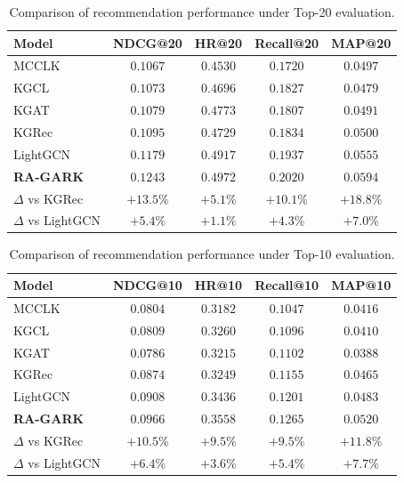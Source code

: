 \begin{table}[H]
\centering
\caption{Comparison of recommendation performance under Top-20 evaluation.}
\label{tab:main}
\begin{tabular}{lcccc}
\toprule
Model & NDCG@20 & HR@20 & Recall@20 & MAP@20 \\
\midrule
MCCLK~\cite{zou2022mcclk}   & $0.1067$ & $0.4530$ & $0.1720$ & $0.0497$ \\
KGCL~\cite{yang2022kgcl}    & $0.1073$ & $0.4696$ & $0.1827$ & $0.0479$ \\
KGAT~\cite{wang2019kgat}    & $0.1079$ & $0.4773$ & $0.1807$ & $0.0491$ \\
KGRec~\cite{yang2023kgrec}  & $0.1095$ & $0.4729$ & $0.1834$ & $0.0500$ \\
LightGCN~\cite{he2020lightgcn} & $0.1179$ & $0.4917$ & $0.1937$ & $0.0555$ \\
\midrule
\textbf{RA-GARK}     & $\mathbf{0.1243}$ & $\mathbf{0.4972}$ & $\mathbf{0.2020}$ & $\mathbf{0.0594}$ \\
\midrule
$\Delta$ vs KGRec            & $+13.5\%$ & $+5.1\%$  & $+10.1\%$ & $+18.8\%$ \\
$\Delta$ vs LightGCN         & $+5.4\%$  & $+1.1\%$  & $+4.3\%$  & $+7.0\%$  \\
\bottomrule
\end{tabular}
\end{table}

\begin{table}[H]
\centering
\caption{Comparison of recommendation performance under Top-10 evaluation.}
\label{tab:main@10}
\begin{tabular}{lcccc}
\toprule
Model & NDCG@10 & HR@10 & Recall@10 & MAP@10 \\
\midrule
MCCLK~\cite{zou2022mcclk}   & $0.0804$ & $0.3182$ & $0.1047$ & $0.0416$ \\
KGCL~\cite{yang2022kgcl}    & $0.0809$ & $0.3260$ & $0.1096$ & $0.0410$ \\
KGAT~\cite{wang2019kgat}    & $0.0786$ & $0.3215$ & $0.1102$ & $0.0388$ \\
KGRec~\cite{yang2023kgrec}  & $0.0874$ & $0.3249$ & $0.1155$ & $0.0465$ \\
LightGCN~\cite{he2020lightgcn} & $0.0908$ & $0.3436$ & $0.1201$ & $0.0483$ \\
\midrule
\textbf{RA-GARK}     & $\mathbf{0.0966}$ & $\mathbf{0.3558}$ & $\mathbf{0.1265}$ & $\mathbf{0.0520}$ \\
\midrule
$\Delta$ vs KGRec            & $+10.5\%$ & $+9.5\%$  & $+9.5\%$  & $+11.8\%$ \\
$\Delta$ vs LightGCN         & $+6.4\%$  & $+3.6\%$  & $+5.4\%$  & $+7.7\%$  \\
\bottomrule
\end{tabular}
\end{table}
\FloatBarrier

